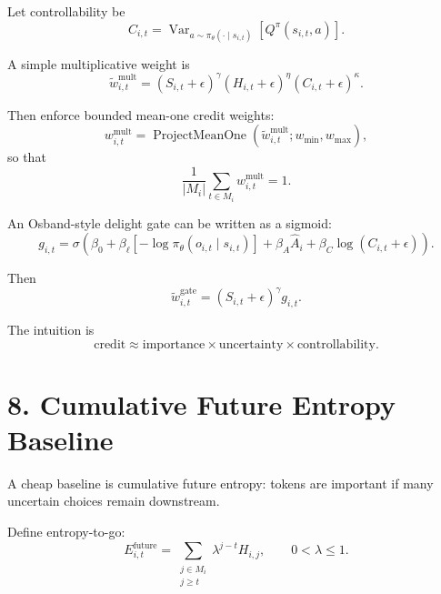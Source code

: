 \documentclass[11pt]{article}
\newcommand{\ProjectMeanOne}{\operatorname{ProjectMeanOne}}
\newcommand{\Var}{\operatorname{Var}}
\begin{document}
Let controllability be
\begin{equation}
  C_{i,t}
  =
  \Var_{a \sim \pi_\theta(\cdot \mid s_{i,t})}
  \left[
    Q^\pi(s_{i,t}, a)
  \right].
\end{equation}

A simple multiplicative weight is
\begin{equation}
  \tilde w^{\mathrm{mult}}_{i,t}
  =
  \left(S_{i,t} + \epsilon\right)^\gamma
  \left(H_{i,t} + \epsilon\right)^\eta
  \left(C_{i,t} + \epsilon\right)^\kappa.
\end{equation}

Then enforce bounded mean-one credit weights:
\begin{equation}
  w^{\mathrm{mult}}_{i,t}
  =
  \ProjectMeanOne
  \left(
    \tilde w^{\mathrm{mult}}_{i,t};
    w_{\min},
    w_{\max}
  \right),
\end{equation}
so that
\begin{equation}
  \frac{1}{|M_i|}
  \sum_{t \in M_i}
  w^{\mathrm{mult}}_{i,t}
  =
  1.
\end{equation}

An Osband-style delight gate can be written as a sigmoid:
\begin{equation}
  g_{i,t}
  =
  \sigma
  \left(
    \beta_0
    +
    \beta_{\ell}
    \left[-\log \pi_\theta(o_{i,t} \mid s_{i,t})\right]
    +
    \beta_A \hat A_i
    +
    \beta_C \log(C_{i,t}+\epsilon)
  \right).
\end{equation}

Then
\begin{equation}
  \tilde w^{\mathrm{gate}}_{i,t}
  =
  \left(S_{i,t}+\epsilon\right)^\gamma
  g_{i,t}.
\end{equation}

The intuition is
\begin{equation}
  \text{credit}
  \approx
  \text{importance}
  \times
  \text{uncertainty}
  \times
  \text{controllability}.
\end{equation}

\section*{8. Cumulative Future Entropy Baseline}

A cheap baseline is cumulative future entropy: tokens are important if many
uncertain choices remain downstream.

Define entropy-to-go:
\begin{equation}
  E^{\mathrm{future}}_{i,t}
  =
  \sum_{\substack{j \in M_i \\ j \ge t}}
  \lambda^{j-t}
  H_{i,j},
  \qquad
  0 < \lambda \le 1.
\end{equation}
\end{document}
